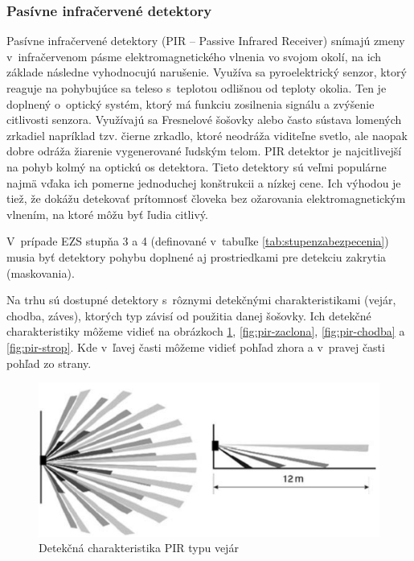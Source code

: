 \subsubsection{Pasívne infračervené detektory}\label{sec:pir}

Pasívne infračervené detektory (PIR – Passive Infrared Receiver) snímajú zmeny v~infračervenom pásme elektromagnetického vlnenia vo svojom okolí, na ich základe následne vyhodnocujú narušenie. Využíva sa pyroelektrický senzor, ktorý reaguje na pohybujúce sa teleso s~teplotou odlišnou od teploty okolia. Ten je doplnený o~optický systém, ktorý má funkciu zosilnenia signálu a zvýšenie citlivosti senzora. Využívajú sa Fresnelové šošovky alebo často sústava lomených zrkadiel napríklad tzv. čierne zrkadlo, ktoré neodráža viditeľne svetlo, ale naopak dobre odráža žiarenie vygenerované ľudským telom. PIR detektor je najcitlivejší na pohyb kolmý na optickú os detektora. Tieto detektory sú veľmi populárne najmä vďaka ich pomerne jednoduchej konštrukcii a nízkej cene. Ich výhodou je tiež, že dokážu detekovať prítomnosť človeka bez ožarovania elektromagnetickým vlnením, na ktoré môžu byť ľudia citlivý.\cite{velas_ezs}

V~prípade EZS stupňa 3 a 4 (definované v~tabuľke \ref{tab:stupenzabezpecenia}) musia byť detektory pohybu doplnené aj prostriedkami pre detekciu zakrytia (maskovania).\cite{csn-en-50131-1}

Na trhu sú dostupné detektory s~rôznymi detekčnými charakteristikami (vejár, chodba, záves),
ktorých typ závisí od použitia danej šošovky. Ich detekčné charakteristiky môžeme vidieť na obrázkoch \ref{fig:pir-vejar}, \ref{fig:pir-zaclona}, \ref{fig:pir-chodba} a \ref{fig:pir-strop}. Kde v~ľavej časti môžeme vidieť pohľad zhora a v~pravej časti pohľad zo strany.

\begin{figure}[!ht]
    \centering
    \includegraphics[width=0.75\linewidth]{obrazky-figures/PIR-vejar.png}
    \caption[Detekčná charakteristika PIR typu vejár]{Detekčná charakteristika PIR typu vejár\cite{PIR-vejar}}
    \label{fig:pir-vejar}
\end{figure}

